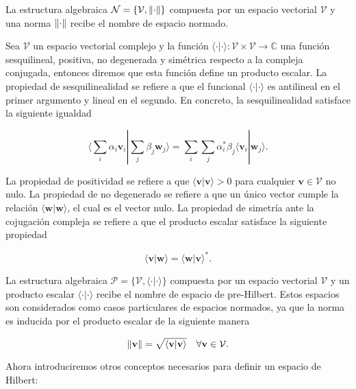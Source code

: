 La estructura algebraica $\mathcal{N} = \{\mathcal{V}, \norm{\cdot}\}$ compuesta por un espacio vectorial $\mathcal{V}$ y una norma $\norm{\cdot}$ recibe el nombre de espacio normado.

Sea $\mathcal{V}$ un espacio vectorial complejo y la función $\langle \cdot | \cdot \rangle: \mathcal{V} \times \mathcal{V} \rightarrow \mathds{C}$ una función sesquilineal, positiva, no degenerada y simétrica respecto a la compleja conjugada, entonces diremos que esta función define un producto escalar. La propiedad de sesquilinealidad se refiere a que el funcional $\langle \cdot | \cdot \rangle$ es antilineal en el primer argumento y lineal en el segundo. En concreto, la sesquilinealidad satisface la siguiente igualdad

\begin{equation}
    \langle \sum_i \alpha_i \mathbf{v}_i | \sum_j \beta_j \mathbf{w}_j \rangle = \sum_i \sum_j \alpha_i^* \beta_j \langle \mathbf{v}_i | \mathbf{w}_j \rangle .
\end{equation}

La propiedad de positividad se refiere a que $\langle \mathbf{v} | \mathbf{v} \rangle > 0$ para cualquier $\mathbf{v} \in \mathcal{V}$ no nulo. La propiedad de no degenerado se refiere a que un único vector cumple la relación $\langle \mathbf{w} | \mathbf{w} \rangle$, el cual es el vector nulo. La propiedad de simetría ante la cojugación compleja se refiere a que el producto escalar satisface la siguiente propiedad

\begin{equation}
    \langle \mathbf{v} | \mathbf{w} \rangle = \langle \mathbf{w} | \mathbf{v} \rangle^* .
\end{equation}

La estructura algebraica $\mathcal{P} = \{\mathcal{V}, \langle \cdot | \cdot \rangle\}$ compuesta por un espacio vectorial $\mathcal{V}$ y un producto escalar $\langle \cdot | \cdot \rangle$ recibe el nombre de espacio de pre-Hilbert. Estos espacios son considerados como casos particulares de espacios normados, ya que la norma es inducida por el producto escalar de la siguiente manera

\begin{equation}
    \norm{\mathbf{v}} = \sqrt{\langle \mathbf{v} | \mathbf{v} \rangle} \quad \forall \mathbf{v} \in \mathcal{V} .
\end{equation}

Ahora introduciremos otros conceptos necesarios para definir un espacio de Hilbert:

